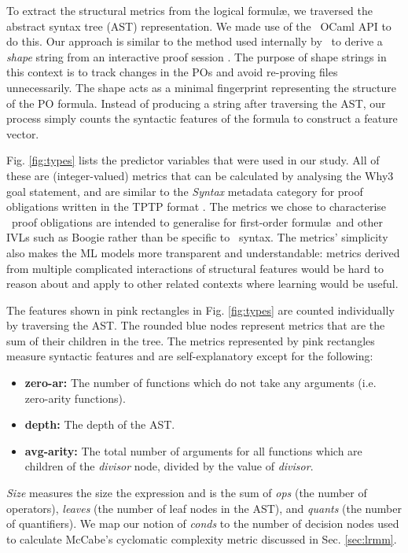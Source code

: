 To extract the structural metrics from the logical formul\ae, we traversed the abstract syntax tree (AST) representation. 
We made use of the \why~OCaml API to do this. 
Our approach is similar to the method used internally by \why~to derive a \textit{shape} string from an interactive proof session \cite{why:preserving}. 
The purpose of shape strings in this context is to track changes in the POs and avoid re-proving files unnecessarily. 
The shape acts as a minimal fingerprint representing the structure of the PO formula. 
Instead of producing a string after traversing the AST, our process simply counts the syntactic features of the formula to construct a feature vector.

Fig. \ref{fig:types} lists the predictor variables that were used in our study.  
All of these are (integer-valued) metrics that can be calculated by analysing the \textsf{Why3} goal statement, and are similar to the \textit{Syntax} metadata category for proof obligations written in the TPTP format \cite{TPTP}. 
The metrics we chose to characterise \why~proof obligations are intended to generalise for first-order formul\ae~and other IVLs such as Boogie \cite{Boogie} rather than be specific to \why~syntax.
The metrics' simplicity also makes the ML models more transparent and understandable: metrics derived from multiple complicated interactions of structural features would be hard to reason about and apply to other related contexts where learning would be useful. 

The features shown in pink rectangles in Fig. \ref{fig:types} are counted individually by traversing the AST. 
The rounded blue nodes represent metrics that are the sum of their children in the tree. 
The metrics represented by pink rectangles measure syntactic features and are self-explanatory except for the following:
\begin{itemize}[leftmargin=*]
	\item[] \textbf{zero-ar:} The number of functions which do not take any arguments (i.e. zero-arity functions).
	\item[] \textbf{depth:} The depth of the AST.
	\item[] \textbf{avg-arity:} The total number of arguments for all functions which are children of the \textit{divisor} node, divided by the value of \textit{divisor}.
\end{itemize}   

\textit{Size} measures the size the expression and is the sum of \textit{ops} (the number of operators), \textit{leaves} (the number of leaf nodes in the AST), and \textit{quants} (the number of quantifiers). 
We map our notion of \textit{conds} to the number of decision nodes used to calculate McCabe's cyclomatic complexity metric discussed in Sec. \ref{sec:lrmm}.
  

